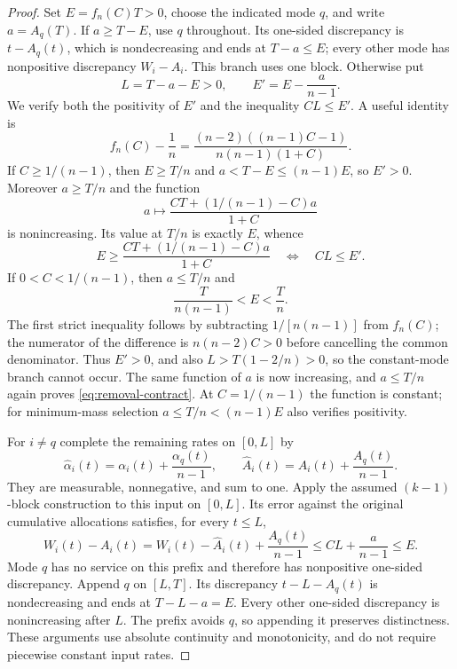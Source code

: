 \begin{proof}
Set $E=f_n(C)T>0$, choose the indicated mode $q$, and write $a=A_q(T)$.
If $a\ge T-E$, use $q$ throughout. Its one-sided discrepancy is
$t-A_q(t)$, which is nondecreasing and ends at $T-a\le E$; every
other mode has nonpositive discrepancy $W_i-A_i$. This branch uses one
block. Otherwise put
\begin{equation}\label{eq:removal-length}
 L=T-a-E>0,\qquad E'=E-\frac{a}{n-1}.
\end{equation}
We verify both the positivity of $E'$ and the inequality $CL\le E'$.
A useful identity is
\begin{equation}\label{eq:removal-sign}
 f_n(C)-\frac1n
 =\frac{(n-2)((n-1)C-1)}{n(n-1)(1+C)}.
\end{equation}
If $C\ge1/(n-1)$, then $E\ge T/n$ and
$a<T-E\le(n-1)E$, so $E'>0$. Moreover $a\ge T/n$ and the function
\[
 a\longmapsto\frac{CT+(1/(n-1)-C)a}{1+C}
\]
is nonincreasing. Its value at $T/n$ is exactly $E$, whence
\begin{equation}\label{eq:removal-contract}
 E\ge\frac{CT+(1/(n-1)-C)a}{1+C}
 \quad\Longleftrightarrow\quad CL\le E'.
\end{equation}
If $0<C<1/(n-1)$, then $a\le T/n$ and
\[
 \frac{T}{n(n-1)}<E<\frac Tn.
\]
The first strict inequality follows by subtracting $1/[n(n-1)]$ from
$f_n(C)$; the numerator of the difference is $n(n-2)C>0$ before
cancelling the common denominator. Thus $E'>0$, and also
$L>T(1-2/n)>0$, so the constant-mode branch cannot occur. The same
function of $a$ is now increasing, and $a\le T/n$ again proves
\eqref{eq:removal-contract}. At $C=1/(n-1)$ the function is constant;
for minimum-mass selection $a\le T/n<(n-1)E$ also verifies positivity.

For $i\ne q$ complete the remaining rates on $[0,L]$ by
\[
 \widehat\alpha_i(t)=\alpha_i(t)+\frac{\alpha_q(t)}{n-1},
 \qquad \widehat A_i(t)=A_i(t)+\frac{A_q(t)}{n-1}.
\]
They are measurable, nonnegative, and sum to one. Apply the assumed
$(k-1)$-block construction to this input on $[0,L]$. Its error against
the original cumulative allocations satisfies, for every $t\le L$,
\[
 W_i(t)-A_i(t)
 =W_i(t)-\widehat A_i(t)+\frac{A_q(t)}{n-1}
 \le CL+\frac a{n-1}\le E.
\]
Mode $q$ has no service on this prefix and therefore has nonpositive
one-sided discrepancy. Append $q$ on $[L,T]$. Its discrepancy
$t-L-A_q(t)$ is nondecreasing and ends at $T-L-a=E$. Every other
one-sided discrepancy is nonincreasing after $L$. The prefix avoids
$q$, so appending it preserves distinctness. These arguments use
absolute continuity and monotonicity, and do not require piecewise
constant input rates.
\end{proof}


